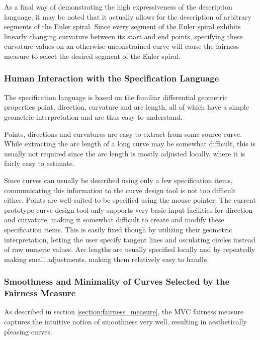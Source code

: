 \documentclass[a4paper]{article}
\begin{document}
				As a final way of demonstrating the high expressiveness of the description language, it may be noted that it actually allows for the description of arbitrary segments of the Euler spiral. Since every segment of the Euler spiral exhibits linearly changing curvature between its start and end points, specifying these curvature values on an otherwise unconstrained curve will cause the fairness measure to select the desired segment of the Euler spiral.

			\subsubsection{Human Interaction with the Specification Language}
			\label{section:human_interaction_specification_language}

				The specification language is based on the familiar differential geometric properties point, direction, curvature and arc length, all of which have a simple geometric interpretation and are thus easy to understand.

				Points, directions and curvatures are easy to extract from some source curve. While extracting the arc length of a long curve may be somewhat difficult, this is usually not required since the arc length is mostly adjusted locally, where it is fairly easy to estimate.

				Since curves can usually be described using only a few specification items, communicating this information to the curve design tool is not too difficult either. Points are well-suited to be specified using the mouse pointer. The current prototype curve design tool only supports very basic input facilities for direction and curvature, making it somewhat difficult to create and modify these specification items. This is easily fixed though by utilizing their geometric interpretation, letting the user specify tangent lines and osculating circles instead of raw numeric values. Arc lengths are usually specified locally and by repeatedly making small adjustments, making them relatively easy to handle.

			\subsubsection{Smoothness and Minimality of Curves Selected by the Fairness Measure}
			\label{section:smoothness_minimality_curves_selected_fairness_measure}

				As described in section \ref{section:fairness_measure}, the MVC fairness measure captures the intuitive notion of smoothness very well, resulting in aesthetically pleasing curves.
\end{document}
